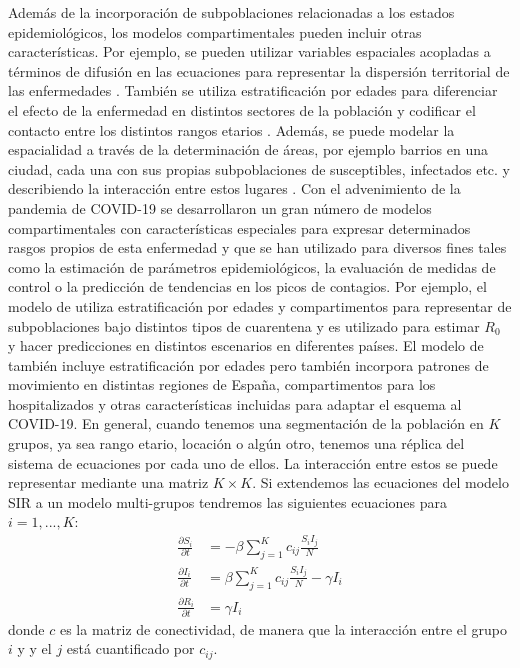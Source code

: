 Además de la incorporación de subpoblaciones relacionadas a los estados epidemiológicos, los modelos compartimentales pueden incluir otras características. Por ejemplo, se pueden utilizar variables espaciales acopladas a términos de difusión en las ecuaciones para representar la dispersión territorial de las enfermedades \citep{Noble1974}. También se utiliza estratificación por edades para diferenciar el efecto de la enfermedad en distintos sectores de la población y codificar el contacto entre los distintos rangos etarios \citep{Hethcote2000}. Además, se puede modelar la espacialidad a través de la determinación de áreas, por ejemplo barrios en una ciudad, cada una con sus propias subpoblaciones de susceptibles, infectados etc. y describiendo la interacción entre estos lugares \citep{Klepac2018}. Con el advenimiento de la pandemia de COVID-19 se desarrollaron un gran número de modelos compartimentales con características especiales para expresar determinados rasgos propios de esta enfermedad y que se han utilizado para diversos fines tales como la estimación de parámetros epidemiológicos, la evaluación de medidas de control o la predicción de tendencias en los picos de contagios. Por ejemplo, el modelo de \cite{Evensen2020} utiliza estratificación por edades y compartimentos para representar de subpoblaciones bajo distintos tipos de cuarentena y es utilizado para estimar $R_0$ y hacer predicciones en distintos escenarios en diferentes países. El modelo de \cite{Arenas2020} también incluye estratificación por edades pero también incorpora patrones de movimiento en distintas regiones de España, compartimentos para los hospitalizados y otras características incluidas para adaptar el esquema al COVID-19. En general, cuando tenemos una segmentación de la población en $K$ grupos, ya sea rango etario, locación o algún otro, tenemos una réplica del sistema de ecuaciones por cada uno de ellos. La interacción entre estos se puede representar mediante una matriz $K \times K$. Si extendemos las ecuaciones del modelo SIR a un modelo multi-grupos tendremos las siguientes ecuaciones para $i=1, ..., K$:
\begin{align}
    \frac{\partial S_i}{\partial t} &= -\beta \sum_{j=1}^{K}c_{ij}\frac{S_i I_j}{N}\\
    \frac{\partial I_i}{\partial t} &= \beta \sum_{j=1}^{K}c_{ij}\frac{S_i I_j}{N} - \gamma I_i \\
    \frac{\partial R_i}{\partial t} &= \gamma I_i
\end{align}
donde $c$ es la matriz de conectividad, de manera que la interacción entre el grupo $i$ y y el $j$ está cuantificado por $c_{ij}$.

